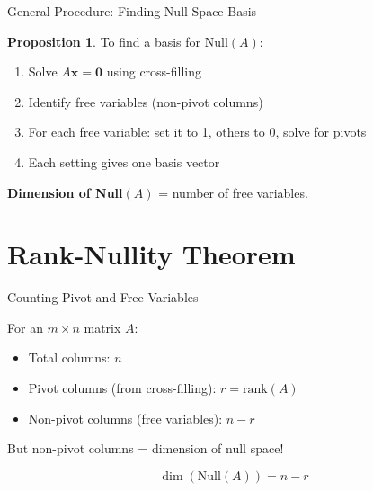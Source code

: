 \documentclass[10pt]{beamer}
\theoremstyle{definition}
\newtheorem{prop}{Proposition}[section]
\newcommand{\x}[1]{\alert{\textbf{#1}}}
\begin{document}
\begin{frame}{General Procedure: Finding Null Space Basis}

\begin{prop}
To find a basis for $\text{Null}(A)$:
\begin{enumerate}
\item Solve $A\mathbf{x} = \mathbf{0}$ using cross-filling
\item Identify free variables (non-pivot columns)
\item For each free variable: set it to 1, others to 0, solve for pivots
\item Each setting gives one basis vector
\end{enumerate}
\end{prop}

\vspace{1em}

\x{Dimension of Null}$(A)$ = number of free variables.

\end{frame}

\section{Rank-Nullity Theorem}

\begin{frame}{Counting Pivot and Free Variables}

For an $m \times n$ matrix $A$:

\vspace{1em}

\begin{itemize}
\item Total columns: $n$
\item Pivot columns (from cross-filling): $r = \text{rank}(A)$
\item Non-pivot columns (free variables): $n - r$
\end{itemize}

\vspace{1em}

But non-pivot columns = dimension of null space!

\vspace{1em}

$$\dim(\text{Null}(A)) = n - r$$

\end{frame}
\end{document}
